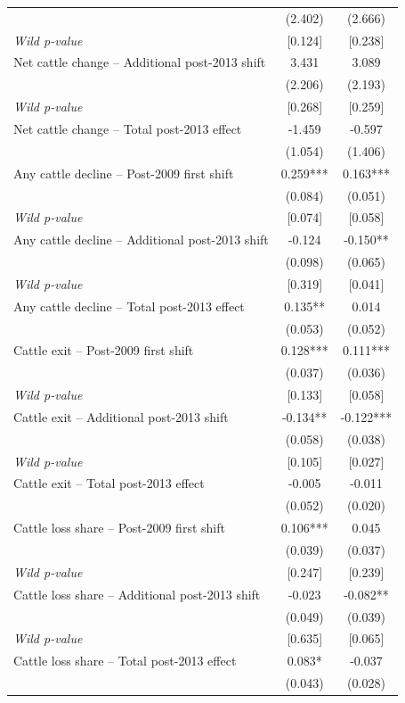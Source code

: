 \begin{table}[!htbp]
\begin{tabular}{lcc}
  & (2.402) & (2.666) \\
\emph{Wild p-value} & [0.124] & [0.238] \\
Net cattle change -- Additional post-2013 shift & 3.431 & 3.089 \\
  & (2.206) & (2.193) \\
\emph{Wild p-value} & [0.268] & [0.259] \\
Net cattle change -- Total post-2013 effect & -1.459 & -0.597 \\
  & (1.054) & (1.406) \\
\addlinespace
Any cattle decline -- Post-2009 first shift & 0.259*** & 0.163*** \\
  & (0.084) & (0.051) \\
\emph{Wild p-value} & [0.074] & [0.058] \\
Any cattle decline -- Additional post-2013 shift & -0.124 & -0.150** \\
  & (0.098) & (0.065) \\
\emph{Wild p-value} & [0.319] & [0.041] \\
Any cattle decline -- Total post-2013 effect & 0.135** & 0.014 \\
  & (0.053) & (0.052) \\
\addlinespace
Cattle exit -- Post-2009 first shift & 0.128*** & 0.111*** \\
  & (0.037) & (0.036) \\
\emph{Wild p-value} & [0.133] & [0.058] \\
Cattle exit -- Additional post-2013 shift & -0.134** & -0.122*** \\
  & (0.058) & (0.038) \\
\emph{Wild p-value} & [0.105] & [0.027] \\
Cattle exit -- Total post-2013 effect & -0.005 & -0.011 \\
  & (0.052) & (0.020) \\
\addlinespace
Cattle loss share -- Post-2009 first shift & 0.106*** & 0.045 \\
  & (0.039) & (0.037) \\
\emph{Wild p-value} & [0.247] & [0.239] \\
Cattle loss share -- Additional post-2013 shift & -0.023 & -0.082** \\
  & (0.049) & (0.039) \\
\emph{Wild p-value} & [0.635] & [0.065] \\
Cattle loss share -- Total post-2013 effect & 0.083* & -0.037 \\
  & (0.043) & (0.028) \\

\end{tabular}
\end{table}
